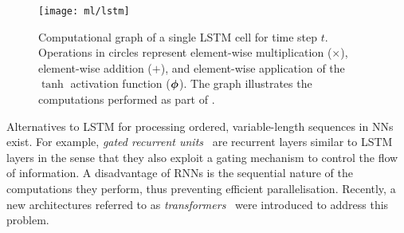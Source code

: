 \begin{figure}[htbp]
  \centering

  \texttt{[image: ml/lstm]}

  \caption{Computational graph of a single LSTM cell for time step
    $t$. Operations in circles represent element-wise multiplication ($\times$),
    element-wise addition ($+$), and element-wise application of the $\tanh$
    activation function ($\bm{\phi}$). The graph illustrates the computations
    performed as part of .}%
  \label{fig:lstm}
\end{figure}

Alternatives to LSTM for processing ordered, variable-length sequences in NNs
exist. For example, \emph{gated recurrent units}~\cite{cho2014properties} are
recurrent layers similar to LSTM layers in the sense that they also exploit a
gating mechanism to control the flow of information. A disadvantage of RNNs is
the sequential nature of the computations they perform, thus preventing
efficient parallelisation. Recently, a new architectures referred to as
\emph{transformers}~\cite{vaswani2017attention} were introduced to address this
problem.








